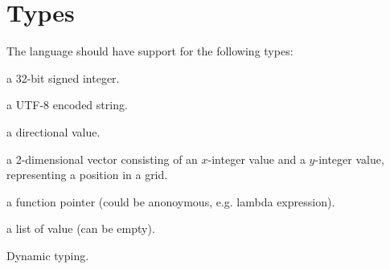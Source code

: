 \section{Types}

The language should have support for the following types:

\begin{description}[noitemsep]
\item[Integer] a 32-bit signed integer.
\item[String] a UTF-8 encoded string.
\item[Direction] a directional value.
\item[Coordinate] a 2-dimensional vector consisting of an $x$-integer value and
a $y$-integer value, representing a position in a grid.
\item[Function] a function pointer (could be anonoymous, e.g. lambda expression).
\item[List] a list of value (can be empty).
\end{description}

Dynamic typing.


